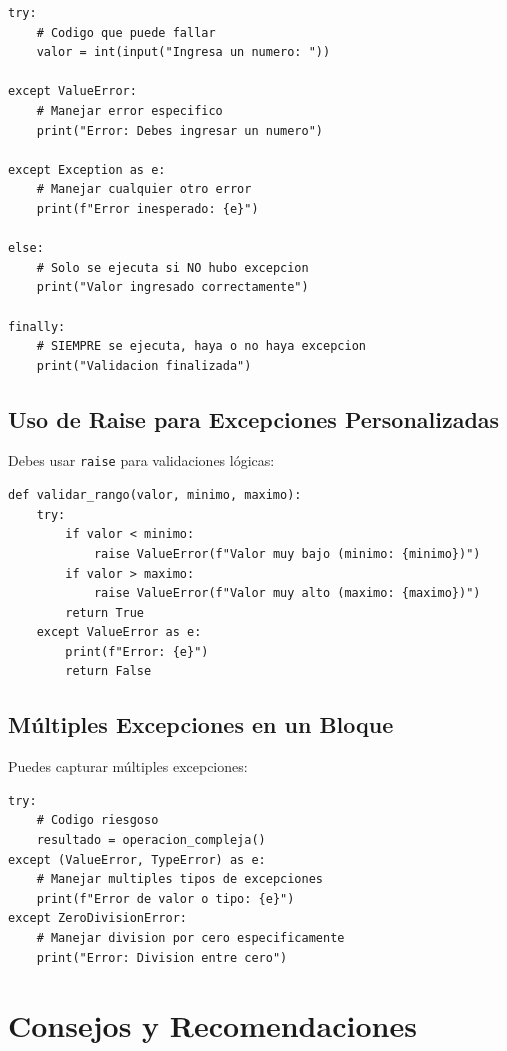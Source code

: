 \documentclass[12pt,a4paper]{article}
\begin{document}
\begin{lstlisting}
try:
    # Codigo que puede fallar
    valor = int(input("Ingresa un numero: "))
    
except ValueError:
    # Manejar error especifico
    print("Error: Debes ingresar un numero")
    
except Exception as e:
    # Manejar cualquier otro error
    print(f"Error inesperado: {e}")
    
else:
    # Solo se ejecuta si NO hubo excepcion
    print("Valor ingresado correctamente")
    
finally:
    # SIEMPRE se ejecuta, haya o no haya excepcion
    print("Validacion finalizada")
\end{lstlisting}

\subsection{Uso de Raise para Excepciones Personalizadas}

Debes usar \texttt{raise} para validaciones lógicas:

\begin{lstlisting}
def validar_rango(valor, minimo, maximo):
    try:
        if valor < minimo:
            raise ValueError(f"Valor muy bajo (minimo: {minimo})")
        if valor > maximo:
            raise ValueError(f"Valor muy alto (maximo: {maximo})")
        return True
    except ValueError as e:
        print(f"Error: {e}")
        return False
\end{lstlisting}

\subsection{Múltiples Excepciones en un Bloque}

Puedes capturar múltiples excepciones:

\begin{lstlisting}
try:
    # Codigo riesgoso
    resultado = operacion_compleja()
except (ValueError, TypeError) as e:
    # Manejar multiples tipos de excepciones
    print(f"Error de valor o tipo: {e}")
except ZeroDivisionError:
    # Manejar division por cero especificamente
    print("Error: Division entre cero")
\end{lstlisting}

\section{Consejos y Recomendaciones}
\end{document}
